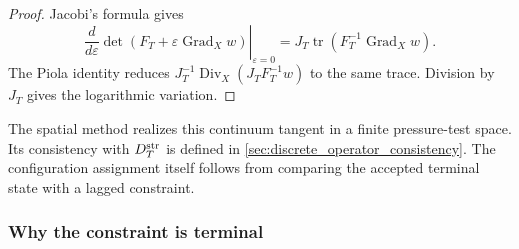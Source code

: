 \documentclass[11pt]{article}
\theoremstyle{plain}
\theoremstyle{definition}
\theoremstyle{remark}
\newcommand{\Grad}{\operatorname{Grad}}
\newcommand{\Div}{\operatorname{Div}}
\newcommand{\tr}{\operatorname{tr}}
\begin{document}
\begin{proof}
Jacobi's formula gives
\[
 \left.\frac{d}{d\varepsilon}\det(F_T+\varepsilon\Grad_Xw)
 \right|_{\varepsilon=0}
 =J_T\tr(F_T^{-1}\Grad_Xw).
\]
The Piola identity reduces
$J_T^{-1}\Div_X(J_TF_T^{-1}w)$ to the same trace.  Division by $J_T$ gives
the logarithmic variation.
\end{proof}

The spatial method realizes this continuum tangent in a finite pressure-test
space.  Its consistency with $D_T^{\rm str}$ is defined in
\cref{sec:discrete_operator_consistency}.  The configuration assignment itself
follows from comparing the accepted terminal state with a lagged constraint.

\subsubsection{Why the constraint is terminal}
\end{document}
